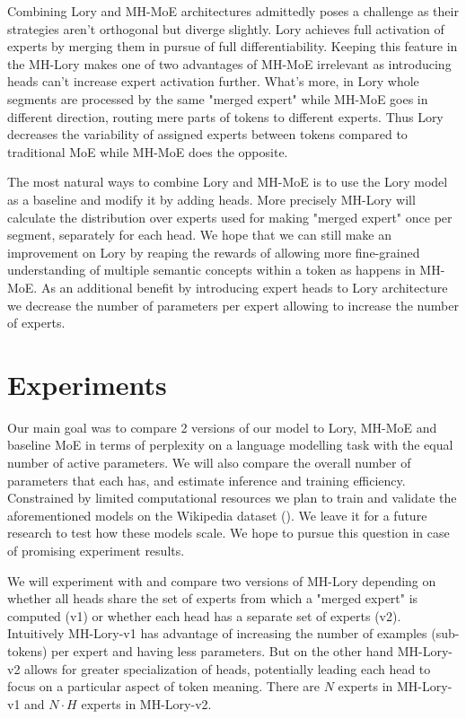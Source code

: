 \documentclass[12pt]{article}
\begin{document}
Combining Lory and MH-MoE architectures admittedly poses a challenge as their strategies aren't orthogonal but diverge slightly. Lory achieves full activation of experts by merging them in pursue of full differentiability. Keeping this feature in the MH-Lory makes one of two advantages of MH-MoE irrelevant as introducing heads can't increase expert activation further. What's more, in Lory whole segments are processed by the same "merged expert" while MH-MoE goes in different direction, routing mere parts of tokens to different experts. Thus Lory decreases the variability of assigned experts between tokens compared to traditional MoE while MH-MoE does the opposite.

The most natural ways to combine Lory and MH-MoE is to use the Lory model as a baseline and modify it by adding heads. More precisely MH-Lory will calculate the distribution over experts used for making "merged expert" once per segment, separately for each head. We hope that we can still make an improvement on Lory by reaping the rewards of allowing more fine-grained understanding of multiple semantic concepts within a token as happens in MH-MoE. As an additional benefit by introducing expert heads to Lory architecture we decrease the number of parameters per expert allowing to increase the number of experts.

\section{Experiments}
Our main goal was to compare 2 versions of our model to Lory, MH-MoE and baseline MoE in terms of perplexity on a language modelling task with the equal number of active parameters. We will also compare the overall number of parameters that each has, and estimate inference and training efficiency.
Constrained by limited computational resources we plan to train and validate the aforementioned models on the Wikipedia dataset (\cite{wikidump}). We leave it for a future research to test how these models scale. We hope to pursue this question in case of promising experiment results.

We will experiment with and compare two versions of MH-Lory depending on whether all heads share the set of experts from which a "merged expert" is computed (v1) or whether each head has a separate set of experts (v2). Intuitively MH-Lory-v1 has advantage of increasing the number of examples (sub-tokens) per expert and having less parameters. But on the other hand MH-Lory-v2 allows for greater specialization of heads, potentially leading each head to focus on a particular aspect of token meaning. There are $N$ experts in MH-Lory-v1 and $N \cdot H$ experts in MH-Lory-v2.
\end{document}

